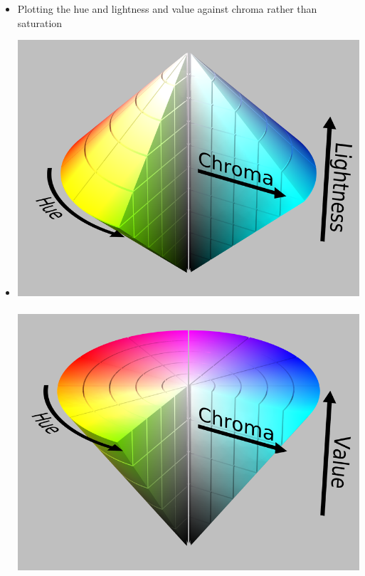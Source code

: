 \documentclass{beamer}
\begin{document}
\begin{frame}
{\begin{itemize}
	\item Plotting the hue and lightness and value against chroma rather than saturation
	\item[]
	\begin{center}
	\includegraphics[scale=0.06]{images/L6_HSL2.png}\
	\includegraphics[scale=0.06]{images/L6_HSV2.png}
	\end{center}	
\end{itemize}
}
\end{frame}
\end{document}

